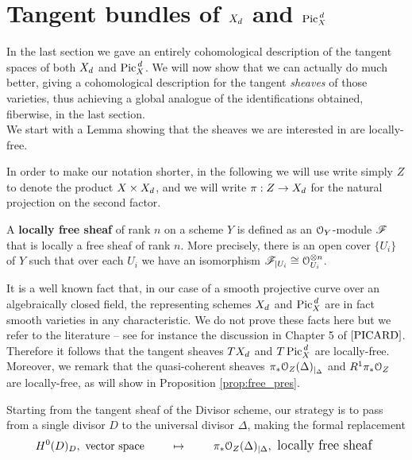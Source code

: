 \section{Tangent bundles of $X_d$ and $\operatorname{Pic}^{\,d}_X$ }
	In the last section we gave an entirely cohomological description of the tangent spaces of both $X_d$ and $\operatorname{Pic}^{\,d}_X$. We will now show that we can actually do much better, giving a cohomological description for the tangent \emph{sheaves} of those varieties, thus achieving a global analogue of the identifications obtained, fiberwise, in the last section. \\
	We start with a Lemma showing that the sheaves we are interested in are locally-free.

	\begin{notation}
		In order to make our notation shorter, in the following we will use write simply $Z$ to denote the product $X\times X_d$, and we will write $\pi:Z\to X_d$ for the natural projection on the second factor. 
	\end{notation}

	\begin{defi}
		A \textbf{locally free sheaf} of rank $n$ on a scheme $Y$ is defined as an $\mathcal{O}_Y$-module $\mathscr{F}$ that is locally a free sheaf of rank $n$. More precisely, there is an open cover $\{U_i\}$ of $Y$ such that over each $U_i$ we have an isomorphism $\mathscr{F}_{\mid U_i} \cong \mathcal{O}_{U_i}^{\otimes n}$.
	\end{defi}

	\begin{rema}\label{rema:smoothness}
		It is a well known fact that, in our case of a smooth projective curve over an algebraically closed field, the representing schemes $X_d$ and $\operatorname{Pic}^{\,d}_X$ are in fact smooth varieties in any characteristic. We do not prove these facts here but we refer to the literature -- see for instance the discussion in Chapter 5 of $\cite{PICARD}$. Therefore it follows that the tangent sheaves $TX_d$ and $T\operatorname{Pic}^{\,d}_X$ are locally-free.\\
		Moreover, we remark that the quasi-coherent sheaves $\pi_* \mathcal{O}_Z(\Delta)_{\mid_\Delta}$ and $R^1\pi_*\mathcal{O}_Z$ are locally-free, as will show in Proposition \ref{prop:free_pres}.\\
	\end{rema}

	Starting from the tangent sheaf of the Divisor scheme, our strategy is to pass from a single divisor $D$ to the universal divisor $\Delta$, making the formal replacement 
	$$ H^0(D)_D, \text{ vector space } \qquad \large\mapsto \qquad \pi_* \mathcal{O}_Z(\Delta)_{\mid \Delta}, \text{ locally free sheaf }$$
	
